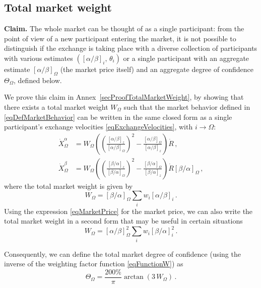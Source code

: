 \documentclass[letterpaper]{article}
\newcommand{\priceAB}{\left[\alpha / \beta\right]}
\newcommand{\priceBA}{\left[\beta / \alpha\right]}
\begin{document}
\subsection{Total market weight}

\textbf{Claim.} The whole market can be thought of as a single participant: from the point of view of a new participant entering the market, it is not possible to distinguish if the exchange is taking place with a diverse collection of participants with various estimates $(\priceAB_i,\, \theta_i)$ or a single participant with an aggregate estimate $\priceAB_\Omega$ (the market price itself) and an aggregate degree of confidence $\Theta_\Omega$, defined below.

We prove this claim in Annex~\ref{secProofTotalMarketWeight}, by showing that there exists a total market weight $W_\Omega$ such that the market behavior defined in \eqref{eqDefMarketBehavior} can be written in the same closed form as a single participant's exchange velocities \eqref{eqExchangeVelocities}, with $i \to \Omega$:
\begin{align}
    \dot{X}_\Omega^\alpha &= W_\Omega \left(\left(\frac{\priceAB_z}{\priceAB_\Omega}\right)^2-\frac{\priceAB_\Omega}{\priceAB_z}\right) \dot{R} \,, \nonumber\\
    \dot{X}_\Omega^\beta &= W_\Omega \left(\left(\frac{\priceBA_z}{\priceBA_\Omega}\right)^2-\frac{\priceBA_\Omega}{\priceBA_z}\right) \dot{R} \priceBA_\Omega \,, \label{eqMarketBehavior}
\end{align}
where the total market weight is given by
\begin{equation}
   W_\Omega = \priceBA_\Omega \sum_i w_i \priceAB_i\,. \label{eqTotalMarketWeight}
\end{equation}
Using the expression \eqref{eqMarketPrice} for the market price, we can also write the total market weight in a second form that may be useful in certain situations
\begin{equation}
   W_\Omega = \priceAB_\Omega^2 \sum_i w_i \priceBA_i^2\,. \label{eqTotalMarketWeight2}
\end{equation}

Consequently, we can define the total market degree of confidence (using the inverse of the  weighting factor function \eqref{eqFunctionW}) as
\begin{equation}
   \Theta_\Omega = \frac{200\%}{\pi} \arctan \left( 3 \, W_\Omega\right) \,. \label{eqTotalMarketDegree}
\end{equation}
\end{document}
